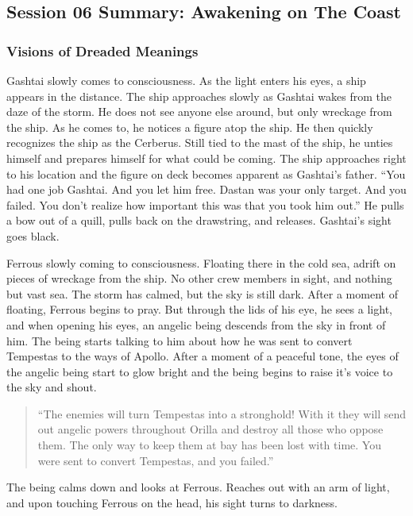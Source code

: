 \subsection{Session 06 Summary: Awakening on The Coast}

\subsubsection{Visions of Dreaded Meanings}

Gashtai slowly comes to consciousness. As the light enters his eyes, a ship appears in the distance. The ship approaches slowly as Gashtai wakes from the daze of the storm. He does not see anyone else around, but only wreckage from the ship. As he comes to, he notices a figure atop the ship. He then quickly recognizes the ship as the Cerberus. Still tied to the mast of the ship, he unties himself and prepares himself for what could be coming. The ship approaches right to his location and the figure on deck becomes apparent as Gashtai's father. ``You had one job Gashtai. And you let him free. Dastan was your only target. And you failed. You don't realize how important this was that you took him out.'' He pulls a bow out of a quill, pulls back on the drawstring, and releases. Gashtai's sight goes black.

Ferrous slowly coming to consciousness. Floating there in the cold sea, adrift on pieces of wreckage from the ship. No other crew members in sight, and nothing but vast sea. The storm has calmed, but the sky is still dark.	After a moment of floating, Ferrous begins to pray. But through the lids of his eye, he sees a light, and when opening his eyes, an angelic being descends from the sky in front of him. The being starts talking to him about how he was sent to convert Tempestas to the ways of Apollo. After a moment of a peaceful tone, the eyes of the angelic being start to glow bright and the being begins to raise it's voice to the sky and shout.

\begin{quote}
	``The enemies will turn Tempestas into a stronghold! With it they will send out angelic powers throughout Orilla and destroy all those who oppose them. The only way to keep them at bay has been lost with time. You were sent to convert Tempestas, and you failed.''
\end{quote}

The being calms down and looks at Ferrous. Reaches out with an arm of light, and upon touching Ferrous on the head, his sight turns to darkness.

